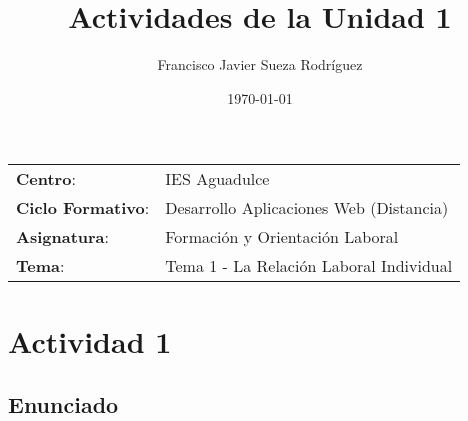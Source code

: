


\title{
\vspace{10ex}
\normalfont \normalsize
\huge \textbf{Actividades de la Unidad 1}
}
\author{Francisco Javier Sueza Rodríguez}
\date{\normalsize\today}



\maketitle

\thispagestyle{empty}

\vspace{75ex}

\begin{center}
    \begin{tabular}{l l}
        \textbf{Centro}: & IES Aguadulce \\
        \textbf{Ciclo Formativo}: & Desarrollo Aplicaciones Web (Distancia)\\
        \textbf{Asignatura}: & Formación y Orientación Laboral\\
        \textbf{Tema}: & Tema 1 -  La Relación Laboral Individual\\
    \end{tabular}
\end{center}

\newpage

\section{Actividad 1}
\subsection{Enunciado}


